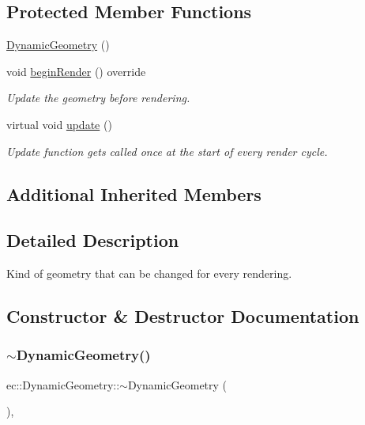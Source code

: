 \subsection*{Protected Member Functions}
\begin{DoxyCompactItemize}
\item 
\mbox{\hyperlink{classec_1_1_dynamic_geometry_a4b0b6439b7c04f652eb74305abfe3bb9}{Dynamic\+Geometry}} ()
\item 
void \mbox{\hyperlink{classec_1_1_dynamic_geometry_ae4eb49e852a4c300325a288bf9ea4408}{begin\+Render}} () override
\begin{DoxyCompactList}\small\item\em Update the geometry before rendering. \end{DoxyCompactList}\item 
virtual void \mbox{\hyperlink{classec_1_1_dynamic_geometry_a76ddfd59d22b89ada5af4fc57e118dee}{update}} ()
\begin{DoxyCompactList}\small\item\em Update function gets called once at the start of every render cycle. \end{DoxyCompactList}\end{DoxyCompactItemize}
\subsection*{Additional Inherited Members}


\subsection{Detailed Description}
Kind of geometry that can be changed for every rendering. 

\subsection{Constructor \& Destructor Documentation}
\mbox{\label{classec_1_1_dynamic_geometry_aeed5b7ffd9876f086207dbaf7e5bc6fc}} 
\subsubsection{\texorpdfstring{$\sim$\+Dynamic\+Geometry()}{~DynamicGeometry()}}
{\footnotesize\ttfamily ec\+::\+Dynamic\+Geometry\+::$\sim$\+Dynamic\+Geometry (\begin{DoxyParamCaption}{ }\end{DoxyParamCaption})\hspace{0.3cm}{\ttfamily [virtual]}, {\ttfamily [default]}}

